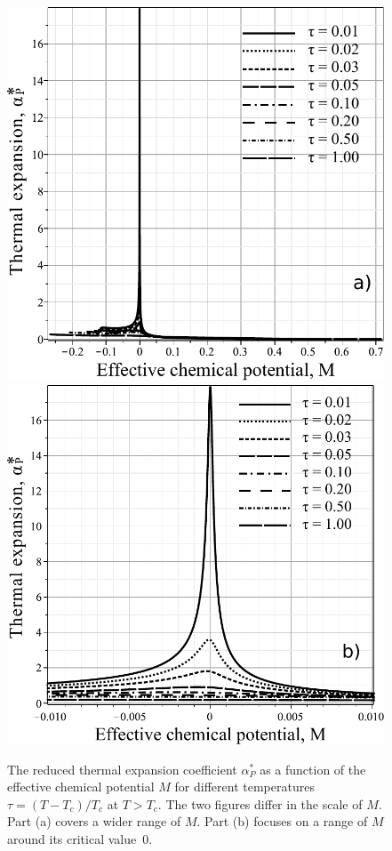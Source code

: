\documentclass[fleqn,twoside,twocolumn,nofootinbib,showkeys]{revtex4} %
\begin{document}
	\begin{figure}[h!]
		\includegraphics[width=\column]{f4b.pdf}
		\includegraphics[width=\column]{f4c.pdf}
		\vskip-3mm
		\caption{The reduced thermal expansion coefficient $\alpha^*_P$ as a function of the effective chemical potential $M$ for different temperatures $\tau = (T - T_c)/T_c$ at $T > T_c$. The two figures differ in the scale of $M$. Part (a) covers a wider range of $M$. Part (b) focuses on a range of $M$ around its critical value~$0$.
		}
		\label{fig4b}
	\end{figure}
	
\end{document}
